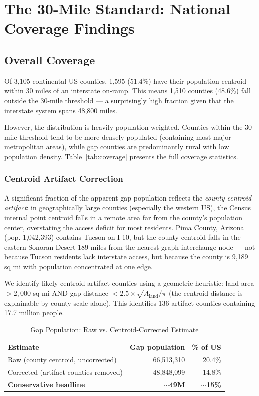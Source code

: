 \section{The 30-Mile Standard: National Coverage Findings}

\subsection{Overall Coverage}

Of 3,105 continental US counties, 1,595 (51.4\%) have their population centroid within 30 miles of an interstate on-ramp. This means 1,510 counties (48.6\%) fall outside the 30-mile threshold --- a surprisingly high fraction given that the interstate system spans 48,800 miles.

However, the distribution is heavily population-weighted. Counties within the 30-mile threshold tend to be more densely populated (containing most major metropolitan areas), while gap counties are predominantly rural with low population density. Table~\ref{tab:coverage} presents the full coverage statistics.

\subsubsection{Centroid Artifact Correction}

A significant fraction of the apparent gap population reflects the \textit{county centroid artifact}: in geographically large counties (especially the western US), the Census internal point centroid falls in a remote area far from the county's population center, overstating the access deficit for most residents. Pima County, Arizona (pop. 1,042,393) contains Tucson on I-10, but the county centroid falls in the eastern Sonoran Desert 189 miles from the nearest graph interchange node --- not because Tucson residents lack interstate access, but because the county is 9,189 sq mi with population concentrated at one edge.

We identify likely centroid-artifact counties using a geometric heuristic: land area $> 2{,}000$ sq mi AND gap distance $< 2.5 \times \sqrt{A_{\text{land}} / \pi}$ (the centroid distance is explainable by county scale alone). This identifies 136 artifact counties containing 17.7 million people.

\begin{table}[h!]
\centering
\caption{Gap Population: Raw vs. Centroid-Corrected Estimate}
\label{tab:corrected}
\begin{tabular}{lrr}
\toprule
\textbf{Estimate} & \textbf{Gap population} & \textbf{\% of US} \\
\midrule
Raw (county centroid, uncorrected) & 66,513,310 & 20.4\% \\
Corrected (artifact counties removed) & 48,848,099 & 14.8\% \\
\midrule
\textbf{Conservative headline} & \textbf{$\sim$49M} & \textbf{$\sim$15\%} \\
\bottomrule
\end{tabular}
\end{table}

